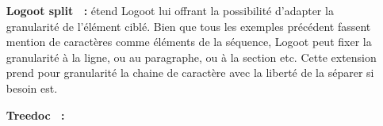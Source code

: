 \begin{itemize}
\item [\textbf{Logoot split~\cite{mehdi2014merging} :}] étend Logoot lui offrant
  la possibilité d'adapter la granularité de l'élément ciblé. Bien que tous les
  exemples précédent fassent mention de caractères comme éléments de la
  séquence, Logoot peut fixer la granularité à la ligne, ou au paragraphe, ou à
  la section etc. Cette extension prend pour granularité la chaine de caractère
  avec la liberté de la séparer si besoin est. 

\item [\textbf{Treedoc~\cite{shapiro2011comprehensive} :}]
\end{itemize}



